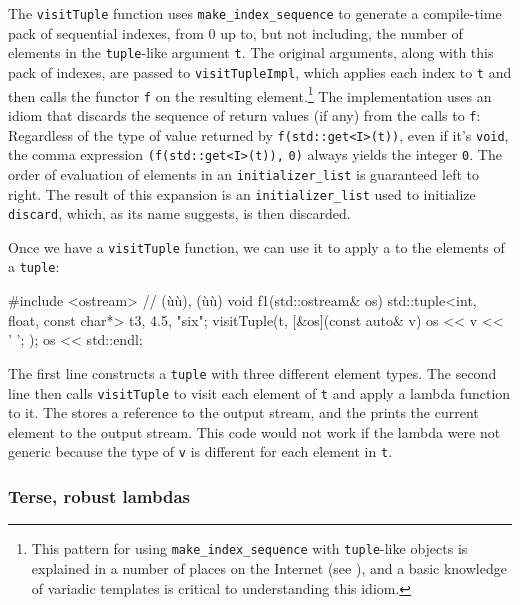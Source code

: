 {\noindent The \lstinline!visitTuple! function uses \lstinline!make_index_sequence! to
generate a compile-time pack of sequential indexes, from 0 up to, but
not including, the number of elements in the \lstinline!tuple!-like
argument \lstinline!t!. The original arguments, along with this pack of
indexes, are passed to \lstinline!visitTupleImpl!, which applies each index
to \lstinline!t! and then calls the functor \lstinline!f! on the resulting
element.{\cprotect\footnote{This pattern for using
\lstinline!make_index_sequence! with \lstinline!tuple!-like objects is
explained in a number of places on the Internet (see \cite{prowl13}),
and a basic knowledge of variadic templates
   is critical to understanding this
  idiom.}} The implementation uses an idiom that discards the sequence
of return values (if any) from the calls to \lstinline!f!: Regardless of
the type of value returned by \lstinline!f(std::get<I>(t))!, even if it's
\lstinline!void!, the comma expression \lstinline!(f(std::get<I>(t)),!
\lstinline!0)! always yields the integer \lstinline!0!. The order of
evaluation of elements in an \lstinline!initializer_list! is guaranteed
left to right. The result of this expansion is an
\lstinline!initializer_list! used to initialize \lstinline!discard!, which,
as its name suggests, is then discarded.

Once we have a \lstinline!visitTuple! function, we can use it to apply a
 to the elements of a \lstinline!tuple!:

\begin{emcppslisting}
#include <ostream>  // (ù{}ù), (ù{}ù)
void f1(std::ostream& os)
{
    std::tuple<int, float, const char*> t{3, 4.5, "six"};
    visitTuple(t, [&os](const auto& v){ os << v << ' '; });
    os << std::endl;
}
\end{emcppslisting}
    

\noindent The first line constructs a \lstinline!tuple! with three different element
types. The second line then calls \lstinline!visitTuple! to visit each
element of \lstinline!t! and apply a lambda function to it. The
 stores a reference to the output stream, and the
 prints the current element to the output stream.
This code would not work if the lambda were not generic because the type
of \lstinline!v! is different for each element in \lstinline!t!.

\subsubsection[Terse, robust lambdas]{Terse, robust lambdas}\label{terse,-robust-lambdas}

}

